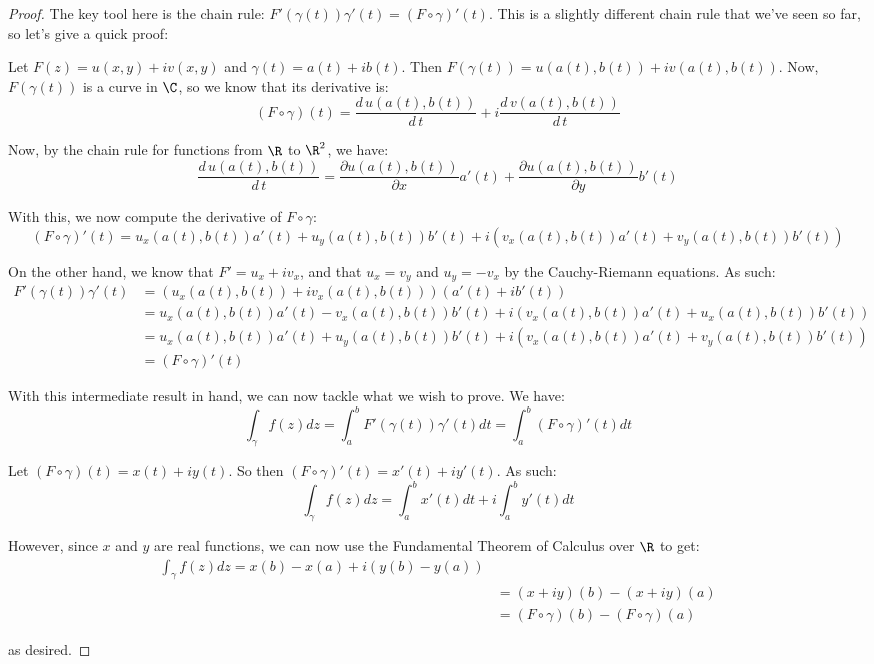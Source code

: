 \begin{proof} The key tool here is the chain rule: $F'(\gamma(t))\gamma'(t) = (F\circ \gamma)'(t)$. This is a slightly different chain rule that we've seen so far, so let's give a quick proof:

Let $F(z) = u(x,y) + iv(x,y)$ and $\gamma(t) = a(t) + ib(t)$. Then $F(\gamma(t)) = u(a(t),b(t)) + iv(a(t),b(t))$. Now, $F(\gamma(t))$ is a curve in $\C$, so we know that its derivative is:
$$(F\circ \gamma)(t) = \frac{d\, u(a(t),b(t))}{d\,t} +i \frac{d\, v(a(t),b(t))}{d\,t}$$

Now, by the chain rule for functions from $\R$ to $\R^2$, we have:
$$\frac{d\, u(a(t),b(t))}{d\,t} = \frac{\partial u(a(t),b(t))}{\partial x}a'(t) + \frac{\partial u(a(t),b(t))}{\partial y}b'(t)$$

With this, we now compute the derivative of $F\circ \gamma$:
$$(F\circ \gamma)'(t) = u_x(a(t),b(t))a'(t) + u_y(a(t),b(t))b'(t) + i\left(v_x(a(t),b(t))a'(t) + v_y(a(t),b(t))b'(t)\right)$$

On the other hand, we know that $F' = u_x + iv_x$, and that $u_x = v_y$ and $u_y = -v_x$ by the Cauchy-Riemann equations. As such:
\begin{align*}F'(\gamma(t))\gamma'(t) &= (u_x(a(t),b(t)) + iv_x(a(t),b(t)))(a'(t) + ib'(t))\\
&= u_x(a(t),b(t))a'(t) - v_x (a(t),b(t))b'(t) + i\left(v_x(a(t),b(t))a'(t) + u_x(a(t),b(t))b'(t)\right)\\
&= u_x(a(t),b(t))a'(t) + u_y(a(t),b(t))b'(t) + i\left(v_x(a(t),b(t))a'(t) + v_y(a(t),b(t))b'(t)\right)\\
&= (F\circ \gamma)'(t)
\end{align*}

With this intermediate result in hand, we can now tackle what we wish to prove. We have:
$$\int_{\gamma} f(z)dz = \int_{a}^b F'(\gamma(t))\gamma'(t)dt = \int_a^b (F\circ \gamma)'(t)dt$$

Let $(F\circ \gamma)(t) = x(t) + iy(t)$. So then $(F\circ \gamma)'(t) = x'(t) + iy'(t)$. As such:
$$\int_{\gamma} f(z)dz = \int_{a}^b x'(t)dt + i \int_{a}^b y'(t)dt$$

However, since $x$ and $y$ are real functions, we can now use the Fundamental Theorem of Calculus over $\R$ to get:
\begin{align*} \int_\gamma f(z)dz = x(b) - x(a) + i(y(b) - y(a))\\
&= (x + iy)(b) - (x + iy)(a)\\
&= (F\circ \gamma)(b) - (F\circ \gamma)(a)
\end{align*}

\noin as desired.
\end{proof}

